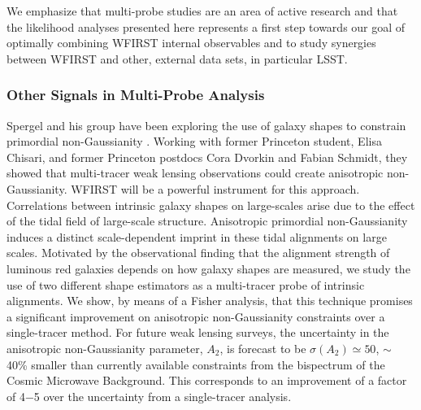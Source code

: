We emphasize that multi-probe studies are an area of active research and that
the likelihood analyses presented here represents a first step towards our goal of optimally combining WFIRST internal observables and to study synergies between WFIRST and other, external data sets, in particular LSST\@.

\subsubsection{Other Signals in Multi-Probe Analysis} Spergel and his group have been exploring  the use of galaxy shapes to constrain primordial non-Gaussianity \citep{Chisari:2016xki}. Working with former Princeton student, Elisa Chisari, and former Princeton postdocs Cora Dvorkin and Fabian Schmidt, they showed that
multi-tracer weak lensing observations could create anisotropic non-Gaussianity. WFIRST
will be a powerful instrument for this approach.  Correlations between intrinsic
galaxy shapes on large-scales arise due to the effect of the tidal field of
large-scale structure. Anisotropic primordial non-Gaussianity induces a distinct
scale-dependent imprint in these tidal alignments on large scales. Motivated by
the observational finding that the alignment strength of luminous red galaxies
depends on how galaxy shapes are measured, we study the use of two different
shape estimators as a multi-tracer probe of intrinsic alignments. We show, by
means of a Fisher analysis, that this technique promises a significant
improvement on anisotropic non-Gaussianity constraints over a single-tracer
method. For future weak lensing surveys, the uncertainty in the anisotropic
non-Gaussianity parameter, $A_2$, is forecast to be $\sigma(A_2)\simeq 50$, $\sim$ 40\% smaller than
currently available constraints from the bispectrum of the Cosmic Microwave
Background. This corresponds to an improvement of a factor of 4−5 over the
uncertainty from a single-tracer analysis.

